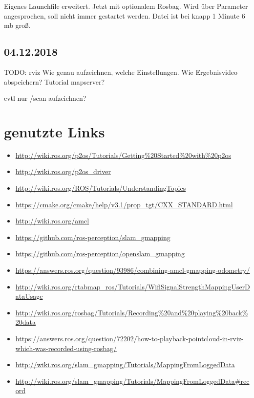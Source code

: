 \documentclass{scrartcl}%
\begin{document}
Eigenes Launchfile erweitert. Jetzt mit optionalem Rosbag. Wird über Parameter angesprochen, soll nicht immer gestartet werden. Datei ist bei knapp 1 Minute 6 mb groß.

\subsection{04.12.2018}
TODO: rviz  Wie genau aufzeichnen, welche Einstellungen. Wie Ergebnisvideo abspeichern? Tutorial mapserver?

evtl nur /scan aufzeichnen?

\section{genutzte Links}
\begin{itemize}
	\item \url{http://wiki.ros.org/p2os/Tutorials/Getting%20Started%20with%20p2os}
		\item \url{http://wiki.ros.org/p2os_driver}
		\item \url{http://wiki.ros.org/ROS/Tutorials/UnderstandingTopics}
		\item \url{https://cmake.org/cmake/help/v3.1/prop_tgt/CXX_STANDARD.html}
		\item \url{http://wiki.ros.org/amcl}
		\item \url{https://github.com/ros-perception/slam\_gmapping}
		\item \url{https://github.com/ros-perception/openslam\_gmapping}
		\item \url{https://answers.ros.org/question/93986/combining-amcl-gmapping-odometry/}
		\item \url{http://wiki.ros.org/rtabmap_ros/Tutorials/WifiSignalStrengthMappingUserDataUsage}
		\item \url{http://wiki.ros.org/rosbag/Tutorials/Recording%20and%20playing%20back%20data}
		\item \url{https://answers.ros.org/question/72202/how-to-playback-pointcloud-in-rviz-which-was-recorded-using-rosbag/}
		\item \url{http://wiki.ros.org/slam_gmapping/Tutorials/MappingFromLoggedData}
		\item \url{http://wiki.ros.org/slam_gmapping/Tutorials/MappingFromLoggedData#record}
	\end{itemize}
\end{document}
